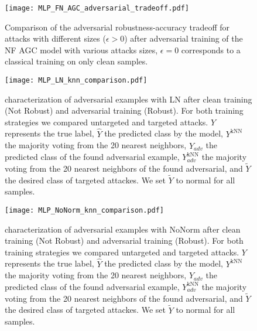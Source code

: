 \begin{figure}[htbp]
	\centering
	\texttt{[image: MLP\_FN\_AGC\_adversarial\_tradeoff.pdf]}
	\caption[ NF AGC adversarial robustness-accuracy tradeoff]{Comparison of the adversarial robustness-accuracy tradeoff for  attacks with different sizes (\(\epsilon > 0\)) after adversarial training of the  NF AGC model with various  attacks sizes, \(\epsilon = 0\) corresponds to a classical training on only clean samples. }\label{fig:mlp_fnagcadv_tradeoff}
\end{figure}


\begin{figure}[htbp]
	\centering
	\texttt{[image: MLP\_LN\_knn\_comparison.pdf]}
	\caption[ characterization of adversarial examples with  LN]{ characterization of adversarial examples with  LN after clean training (Not Robust) and adversarial training (Robust). For both training strategies we compared untargeted and targeted attacks. \(Y\) represents the true label, \(\hat{Y}\) the predicted class by the model, \(Y^{\text{kNN}}\) the majority voting from the 20 nearest neighbors, \(\hat{Y}_{adv}\) the predicted class of the found adversarial example, \(Y^{\text{kNN}}_{adv}\) the majority voting from the 20 nearest neighbors of the found adversarial, and \(\tilde{Y}\) the desired class of targeted attackes. We set \(\tilde{Y}\) to normal for all samples.}\label{fig:mlp_ln_knn_comp}
\end{figure}

\begin{figure}[htbp]
	\centering
	\texttt{[image: MLP\_NoNorm\_knn\_comparison.pdf]}
	\caption[ characterization of adversarial examples with  NoNorm]{ characterization of adversarial examples with  NoNorm after clean training (Not Robust) and adversarial training (Robust). For both training strategies we compared untargeted and targeted attacks. \(Y\) represents the true label, \(\hat{Y}\) the predicted class by the model, \(Y^{\text{kNN}}\) the majority voting from the 20 nearest neighbors, \(\hat{Y}_{adv}\) the predicted class of the found adversarial example, \(Y^{\text{kNN}}_{adv}\) the majority voting from the 20 nearest neighbors of the found adversarial, and \(\tilde{Y}\) the desired class of targeted attackes. We set \(\tilde{Y}\) to normal for all samples.}\label{fig:mlp_nonorm_knn_comp}
\end{figure}

